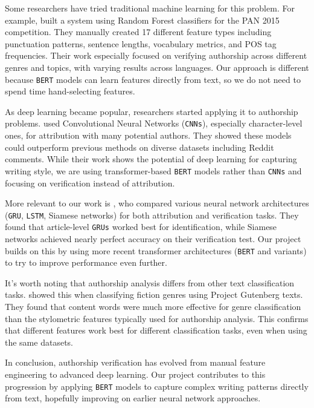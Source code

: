 \documentclass[12pt,a4paper]{article}
\begin{document}
Some researchers have tried traditional machine learning for this problem. For example, \citet{maitra2015randomforest} built a system using Random Forest classifiers for the PAN 2015 competition. They manually created 17 different feature types including punctuation patterns, sentence lengths, vocabulary metrics, and POS tag frequencies. Their work especially focused on verifying authorship across different genres and topics, with varying results across languages. Our approach is different because \texttt{BERT} models can learn features directly from text, so we do not need to spend time hand-selecting features.

As deep learning became popular, researchers started applying it to authorship problems. \citet{ruder2016character} used Convolutional Neural Networks (\texttt{CNNs}), especially character-level ones, for attribution with many potential authors. They showed these models could outperform previous methods on diverse datasets including Reddit comments. While their work shows the potential of deep learning for capturing writing style, we are using transformer-based \texttt{BERT} models rather than \texttt{CNNs} and focusing on verification instead of attribution.

More relevant to our work is \citet{qian2017deeplearning}, who compared various neural network architectures (\texttt{GRU}, \texttt{LSTM}, Siamese networks) for both attribution and verification tasks. They found that article-level \texttt{GRUs} worked best for identification, while Siamese networks achieved nearly perfect accuracy on their verification test. Our project builds on this by using more recent transformer architectures (\texttt{BERT} and variants) to try to improve performance even further.

It's worth noting that authorship analysis differs from other text classification tasks. \citet{bucher2018classification} showed this when classifying fiction genres using Project Gutenberg texts. They found that content words were much more effective for genre classification than the stylometric features typically used for authorship analysis. This confirms that different features work best for different classification tasks, even when using the same datasets.

In conclusion, authorship verification has evolved from manual feature engineering to advanced deep learning. Our project contributes to this progression by applying \texttt{BERT} models to capture complex writing patterns directly from text, hopefully improving on earlier neural network approaches.
\end{document}
